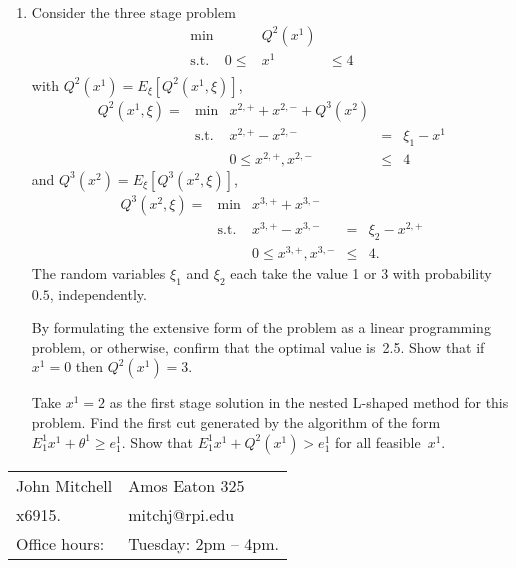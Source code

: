 \documentclass[12pt]{article}
\begin{document}
\begin{enumerate}
\item  Consider the three stage problem
\begin{displaymath}
\begin{array}{lrcl}
\min && Q^2(x^1) \\
\mbox{s.t.} & 0  \leq & x^1 & \leq 4 \\
\end{array}
\end{displaymath}
with $Q^2(x^1)=E_{\xi}[Q^2(x^1,\xi)]$,
\begin{displaymath}
\begin{array}{rlrcl}
Q^2(x^1,\xi) = & \min & x^{2,+} + x^{2,-} + Q^3(x^2) \\
&\mbox{s.t.} & x^{2,+} - x^{2,-} & = & \xi_1 - x^1 \\
&& 0 \leq  x^{2,+}, x^{2,-} & \leq & 4
\end{array}
\end{displaymath}
and $Q^3(x^2)=E_{\xi}[Q^3(x^2,\xi)]$,
\begin{displaymath}
\begin{array}{rlrcl}
Q^3(x^2,\xi) = & \min & x^{3,+} + x^{3,-} \\
&\mbox{s.t.} & x^{3,+} - x^{3,-} & = & \xi_2 - x^{2,+} \\
&& 0 \leq x^{3,+}, x^{3,-} & \leq & 4.
\end{array}
\end{displaymath}
The random variables $\xi_1$ and $\xi_2$ each take the value 1 or 3 with probability~$0.5$,
independently.

By formulating the extensive form of the problem as a linear programming problem,
or otherwise,
confirm that the optimal value is~2.5.
Show that if $x^1=0$ then $Q^2(x^1)=3$.

Take $x^1=2$ as the first stage solution in the nested L-shaped method for this problem.
Find the first cut generated by the algorithm of the form $E^1_1x^1 + \theta^1 \geq e^1_1$.
Show that $E^1_1x^1 + Q^2(x^1) > e^1_1$ for all feasible~$x^1$. 
\end{enumerate}

\vfill

\begin{tabular}{@{\hspace{.5in}}ll}
   John Mitchell  &
   Amos Eaton 325  \\
   x6915.  &
   mitchj@rpi.edu  \\
   Office hours:  &
   Tuesday: 2pm -- 4pm.
\end{tabular}
\end{document}
